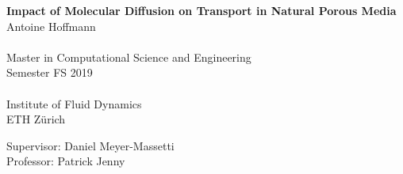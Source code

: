 \documentclass[smallheadings,headsepline,11pt,oneside,a4paper]{scrbook}
\begin{document}
\frontmatter							%


\begin{titlepage}
\begin{center}
    \vspace*{1cm}
    {\huge \bfseries  Impact of Molecular Diffusion on Transport in Natural Porous Media\\ }
    \vspace{2cm}
    {\large 
	Antoine Hoffmann\\
	~\\
	Master in Computational Science and Engineering\\
	\vspace{3.5cm}
	Semester FS 2019\\
	~\\
	Institute of Fluid Dynamics\\
	ETH Zürich\\
    }




{\large
	Supervisor: Daniel Meyer-Massetti\\[\baselineskip]
	Professor: Patrick Jenny
}
\end{center}

\vspace*{2cm} %

\end{titlepage}



\begin{titlepage}
\thispagestyle{empty}
\newpage
\mbox{}
\end{titlepage}






\tableofcontents
\end{document}
